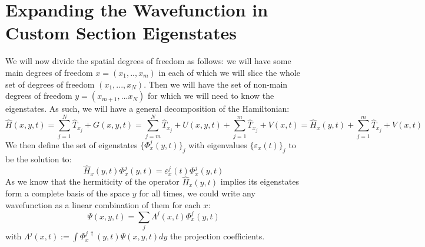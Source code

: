 \documentclass[11pt, a4paper]{article} %
\begin{document}
\section{Expanding the Wavefunction in Custom Section Eigenstates}
We will now divide the spatial degrees of freedom as follows: we will have some main degrees of freedom $x=(x_1,..,x_m)$ in each of which we will slice the whole set of degrees of freedom $(x_1,...,x_N)$. Then we will have the set of non-main degrees of freedom $y=(x_{m+1},...x_N)$ for which we will need to know the eigenstates. As such, we will have a general decomposition of the Hamiltonian:
\begin{equation}
\hat{H}(x, y, t)= \sum_{j=1}^{N}\hat{T}_{x_j}+G(x, y, t)=\sum_{j=m}^{N}\hat{T}_{x_j}+U(x, y, t)+\sum_{j=1}^{m}\hat{T}_{x_j}+V(x,t) = \hat{H}_x(y,t)+\sum_{j=1}^{m}\hat{T}_{x_j}+V(x,t)
\end{equation}
We then define the set of eigenstates $\{\Phi^j_x(y,t)\}_j$ with eigenvalues $\{\varepsilon_x(t)\}_j$ to be the solution to:
\begin{equation}
\hat{H}_x(y,t)\Phi^j_x(y,t)=\varepsilon^j_x(t)\Phi^j_x(y,t)
\end{equation}
As we know that the hermiticity of the operator $\hat{H}_x(y,t)$ implies its eigenstates form a complete basis of the space $y$ for all times, we could write any wavefunction as a linear combination of them for each $x$:
\begin{equation}
\Psi(x,y,t)=\sum_j \Lambda^j(x,t) \Phi^j_x(y,t)
\end{equation}
with $\Lambda^j(x,t):= \int \Phi^{j\ \dagger}_x(y,t) \Psi(x,y,t)dy$ the projection coefficients.
\end{document}
